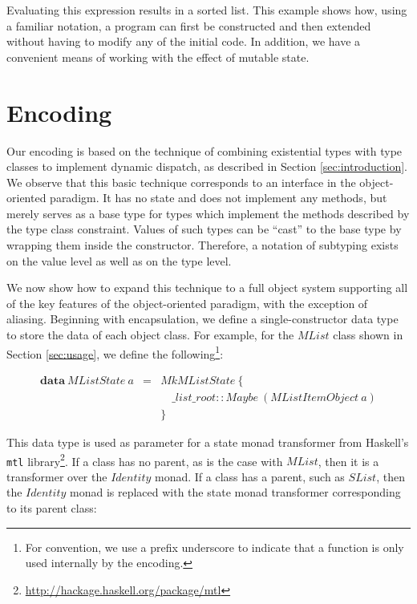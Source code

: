 \documentclass[runningheads,a4paper]{llncs}
\begin{document}
Evaluating this expression results in a sorted list. This example shows how, using a familiar notation, a program can first be constructed and then extended without having to modify any of the initial code. In addition, we have a convenient means of working with the effect of mutable state.

\section{Encoding}
\label{sec:encoding}

Our encoding is based on the technique of combining existential types with type classes to implement dynamic dispatch, as described in Section \ref{sec:introduction}. We observe that this basic technique corresponds to an interface in the object-oriented paradigm. It has no state and does not implement any methods, but merely serves as a base type for types which implement the methods described by the type class constraint. Values of such types can be ``cast'' to the base type by wrapping them inside the constructor. Therefore, a notation of subtyping exists on the value level as well as on the type level.

We now show how to expand this technique to a full object system supporting all of the key features of the object-oriented paradigm, with the exception of aliasing. Beginning with encapsulation, we define a single-constructor data type to store the data of each object class. For example, for the $\mathit{MList}$ class shown in Section \ref{sec:usage}, we define the following\footnote{For convention, we use a prefix underscore to indicate that a function is only used internally by the encoding.}:

\begin{displaymath}
\begin{array}{lcl}
\mathbf{data}~\mathit{MListState}~a & = & \mathit{MkMListState}~\{\\
 && \quad \_ \mathit{list} \_ \mathit{root} :: \mathit{Maybe}~(\mathit{MListItemObject~a}) \\
 && \}
\end{array}
\end{displaymath}

This data type is used as parameter for a state monad transformer from Haskell's \texttt{mtl} library\footnote{\url{http://hackage.haskell.org/package/mtl}}. If a class has no parent, as is the case with $\mathit{MList}$, then it is a transformer over the $\mathit{Identity}$ monad. If a class has a parent, such as $\mathit{SList}$, then the $\mathit{Identity}$ monad is replaced with the state monad transformer corresponding to its parent class:
\end{document}
